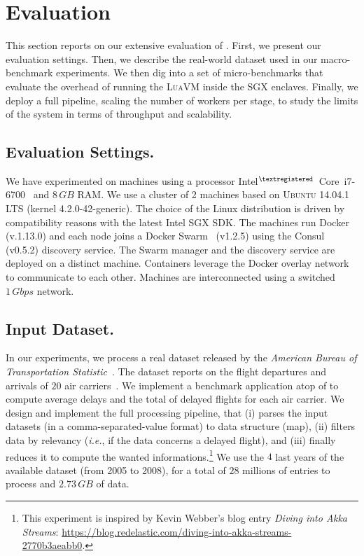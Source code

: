 \section{Evaluation}\label{sec:eval}
This section reports on our extensive evaluation of \SYS{}.
First, we present our evaluation settings.
Then, we describe the real-world dataset used in our macro-benchmark experiments.
We then dig into a set of micro-benchmarks that evaluate the overhead of running the \textsc{LuaVM} inside the SGX enclaves.
Finally, we deploy a full \SYS{} pipeline, scaling the number of workers per stage, to study the limits of the system in terms of throughput and scalability.


\subsection{Evaluation Settings.}
We have experimented on machines using a processor Intel$^{\tiny{\textregistered}}$~Core\texttrademark~i7-6700~\cite{intel:i7_6700} and $8\,GB$ RAM.
We use a cluster of 2 machines based on \textsc{Ubuntu} 14.04.1 LTS (kernel 4.2.0-42-generic).
The choice of the Linux distribution is driven by compatibility reasons with the latest Intel SGX SDK. 
The machines run Docker (v.1.13.0) and each node joins a Docker Swarm~\cite{docker:swarm_2016} (v1.2.5) using the Consul~\cite{consul} (v0.5.2) discovery service.
The Swarm manager and the discovery service are deployed on a distinct machine.
Containers leverage the Docker overlay network to communicate to each other.
Machines are interconnected using a switched $1\,Gbps$ network.



\subsection{Input Dataset.}
In our experiments, we process a real dataset released by the \emph{American Bureau of Transportation Statistic}~\cite{rita:bts}.
The dataset reports on the flight departures and arrivals of $20$ air carriers~\cite{statistical_computing:data}.
We implement a benchmark application atop of \SYS{} to compute average delays and the total of delayed flights for each air carrier.
We design and implement the full processing pipeline, that (i) parses the input datasets (in a comma-separated-value format) to data structure (\textsf{map}), (ii) filters data by relevancy (\emph{i.e.}, if the data concerns a delayed flight), and (iii) finally reduces it to compute the wanted informations.\footnote{This experiment is inspired by Kevin Webber's blog entry \emph{Diving into Akka Streams}: \url{https://blog.redelastic.com/diving-into-akka-streams-2770b3aeabb0}.}
We use the $4$ last years of the available dataset (from 2005 to 2008), for a total of $28$ millions of entries to process and $2.73\,GB$ of data.

